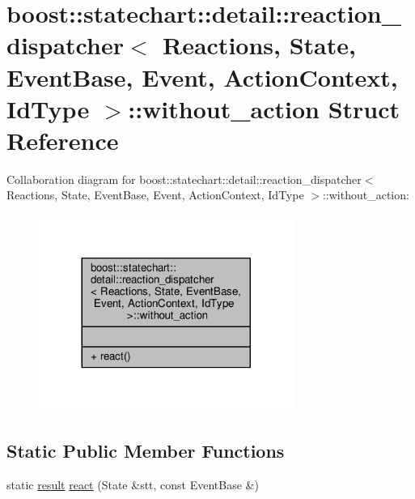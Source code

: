 \hypertarget{structboost_1_1statechart_1_1detail_1_1reaction__dispatcher_1_1without__action}{}\section{boost\+:\+:statechart\+:\+:detail\+:\+:reaction\+\_\+dispatcher$<$ Reactions, State, Event\+Base, Event, Action\+Context, Id\+Type $>$\+:\+:without\+\_\+action Struct Reference}
\label{structboost_1_1statechart_1_1detail_1_1reaction__dispatcher_1_1without__action}


Collaboration diagram for boost\+:\+:statechart\+:\+:detail\+:\+:reaction\+\_\+dispatcher$<$ Reactions, State, Event\+Base, Event, Action\+Context, Id\+Type $>$\+:\+:without\+\_\+action\+:
\nopagebreak
\begin{figure}[H]
\begin{center}
\leavevmode
\includegraphics[width=236pt]{structboost_1_1statechart_1_1detail_1_1reaction__dispatcher_1_1without__action__coll__graph}
\end{center}
\end{figure}
\subsection*{Static Public Member Functions}
\begin{DoxyCompactItemize}
\item 
static \mbox{\hyperlink{namespaceboost_1_1statechart_abe807f6598b614d6d87bb951ecd92331}{result}} \mbox{\hyperlink{structboost_1_1statechart_1_1detail_1_1reaction__dispatcher_1_1without__action_ae8ebdf0a6a44e5072b6c08e22c95b078}{react}} (State \&stt, const Event\+Base \&)
\end{DoxyCompactItemize}


